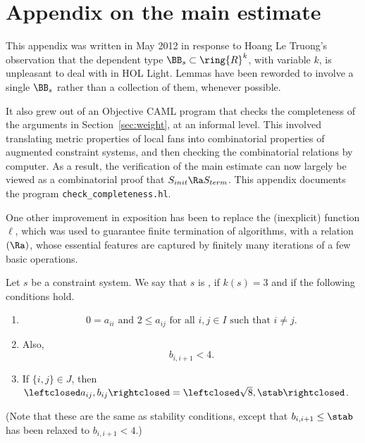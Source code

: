 

\newpage
\section{Appendix on the main estimate}\label{sec:sup-local-fan}

This appendix was written in May 2012 in response to Hoang Le Truong's observation that the dependent type $\BB_s\subset \ring{R}^k$, with variable $k$, is unpleasant to deal with in HOL Light.  Lemmas have been reworded to involve a single $\BB_s$
rather than a collection of them, whenever possible.

 It also grew out of an Objective CAML program that checks the completeness of the arguments in Section~\ref{sec:weight}, at an informal level.  This involved translating metric properties of local fans into combinatorial
properties of augmented constraint systems, and then checking the combinatorial
relations by computer.  As a result, the verification of the main estimate
can now largely be viewed as a combinatorial proof that $S_{init}\Ra S_{term}$.
This appendix documents the program \verb!check_completeness.hl!.

One other improvement in exposition has been to replace the (inexplicit)
function $\ell$, which was used to guarantee finite termination of algorithms,
with a relation $(\Ra)$, whose essential features are captured by
finitely
many iterations of a few basic operations.

\begin{definition}
Let $s$ be a constraint system.  We say that $s$ is , if $k(s)=3$
and if the
following conditions hold.
\begin{enumerate}
\item 
\[
0 = a_{ii}\text{ and }2\le a_{ij} \text{ for all }  i,j\in I \text{ such that } i\ne j.
\]  
\item
  Also, 
\[
  b_{i,i+1} < 4.
\]  
\item
If $\{i,j\}\in J$, then $\leftclosed
  a_{ij},b_{ij}\rightclosed=\leftclosed\sqrt{8},\stab\rightclosed$.
\end{enumerate}
(Note that these are the same as stability conditions, except that
$b_{i,i+1}\le \stab$ has been relaxed to $b_{i,i+1}<4$.)
\end{definition}

